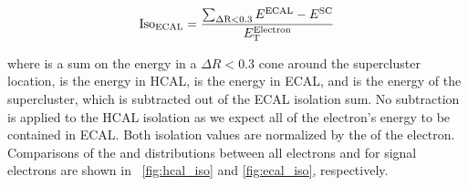 \begin{equation}
    \text{Iso}_{\text{ECAL}} = \frac{\sum_{\Delta \text{R}<0.3} E^{\text{ECAL}} - E^{\text{SC}}}{E_{\mathrm{T}}^{\text{Electron}}}
\end{equation}

\noindent where \DeltaRSum is a sum on the energy in a $\Delta R < 0.3$ cone around the
supercluster location, \EHCAL is the energy in HCAL, \EECAL is the energy in
ECAL, and \ESC is the energy of the supercluster, which is subtracted out of
the ECAL isolation sum. No subtraction is applied to the HCAL isolation as we
expect all of the electron's energy to be contained in ECAL. Both isolation
values are normalized by the \et of the electron. Comparisons of the \HCALISO
and \ECALISO distributions between all electrons and for signal electrons are
shown in \FIGS~\ref{fig:hcal_iso} and \ref{fig:ecal_iso}, respectively.

